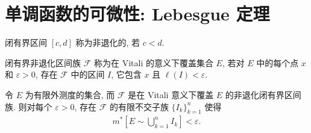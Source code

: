 \documentclass[../../main.tex]{subfiles}
\begin{document}
\section{单调函数的可微性: Lebesgue 定理}\label{section:ch06-Lebesgue定理}

闭有界区间 $[c,d]$ 称为非退化的, 若 $c<d$.

\begin{definition}[Vitali 覆盖]\label{definition:ch06-Vitali覆盖}
闭有界非退化区间族 $\mathcal{F}$ 称为在 Vitali 的意义下覆盖集合 $E$, 若对 $E$ 中的每个点 $x$ 和 $\varepsilon>0$, 存在 $\mathcal{F}$ 中的区间 $I$, 它包含 $x$ 且 $\ell(I)<\varepsilon$.
\end{definition}

\begin{lemma}\label{lemma:ch06-Vitali}
令 $E$ 为有限外测度的集合, 而 $\mathcal{F}$ 是在 Vitali 意义下覆盖 $E$ 的非退化闭有界区间族. 则对每个 $\varepsilon>0$, 存在 $\mathcal{F}$ 的有限不交子族 $\{I_{k}\}_{k=1}^{n}$ 使得
\begin{align}
m^{*}\left[E\sim\bigcup_{k=1}^{n}I_{k}\right]<\varepsilon.\label{align:ch06-Vitali}
\end{align}
\end{lemma}
\end{document}
